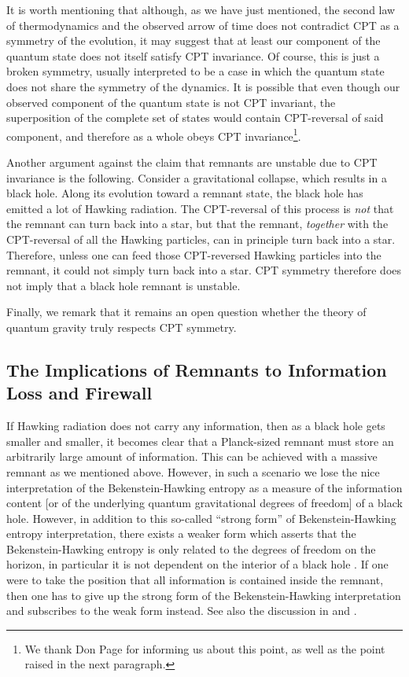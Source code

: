 \documentclass[12pt]{article}
\newcommand{\2}{$^2$}
\newcommand{\3}{$^3$}
\newcommand{\4}{$_4$}
\newcommand{\5}{$_5$}
\begin{document}
{\color{black}It is worth mentioning that although, as we have just mentioned, the second law of thermodynamics and the observed arrow
of time does not contradict CPT as a symmetry of the evolution, it may 
suggest that at least our component of the quantum state does not
itself satisfy CPT invariance.  Of course, this is just a broken
symmetry, usually interpreted to be a case in which the quantum state
does not share the symmetry of the dynamics. It is possible that even though our observed component of the quantum state is not CPT invariant, the superposition of the complete set of states would contain CPT-reversal of said component, and therefore as a whole obeys CPT invariance\footnote{\color{black}We thank Don Page for informing us about this point, as well as the point raised in the next paragraph.}. }

{\color{black}Another argument against the claim that remnants are unstable due to CPT invariance is the following. Consider a gravitational collapse, which results in a black hole. Along its evolution toward a remnant state, the black hole has emitted a lot of Hawking radiation. The CPT-reversal of this process is \emph{not} that the remnant can turn back into a star, but that the remnant, \emph{together} with the CPT-reversal of all the Hawking particles, can in principle turn back into a star. Therefore, unless one can feed those CPT-reversed Hawking particles into the remnant, it could not simply turn back into a star. CPT symmetry therefore does not imply that a black hole remnant is unstable.

Finally, we remark that it remains an open question whether the theory of quantum gravity truly respects CPT symmetry.}

\subsection{The Implications of Remnants to Information Loss and Firewall}\label{3.3}

If Hawking radiation does not carry any information, then as a black hole gets smaller and smaller, it becomes clear that a Planck-sized remnant must store an arbitrarily large amount of information. This can be achieved with a massive remnant as we mentioned above. However, in such a scenario we lose the nice interpretation of the Bekenstein-Hawking entropy as a measure of the information content [or of the underlying quantum gravitational degrees of freedom] of a black hole. However, in addition to this so-called ``strong form'' of Bekenstein-Hawking entropy interpretation, there exists a weaker form which asserts that the Bekenstein-Hawking entropy is only related to the degrees of freedom on the horizon, in particular it is not dependent on the interior of a black hole \cite{sabine, Smolin-1}. If one were to take the position that all information is contained inside the remnant, then one has to give up the strong form of the Bekenstein-Hawking interpretation and subscribes to the weak form instead. See also the discussion in \cite{inout} and \cite{marolf}.  
\end{document}
